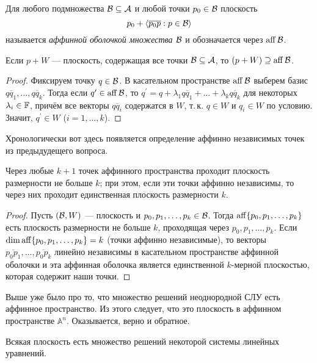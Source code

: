 \begin{definition}
    Для любого подмножества $\mathcal{B} \subseteq \mathcal{A}$ и любой точки $p_0 \in \mathcal{B}$ плоскость
    \[
        p_0 + \langle\overline{p_0p} : p \in \mathcal{B}\rangle
    \]
    называется \textit{аффинной оболочкой множества $\mathcal{B}$} и обозначается через $\operatorname{aff}\mathcal{B}$.
\end{definition}

\begin{proposal}
    Если $p + W$ --- плоскость, содержащая все точки $\mathcal{B} \subseteq \mathcal{A}$, то $(p + W) \supseteq \operatorname{aff}\mathcal{B}$.
\end{proposal}

\begin{proof}
    Фиксируем точку $q \in \mathcal{B}$. В касательном пространстве $\operatorname{aff}\mathcal{B}$ выберем базис $\overline{qq_1}, \ldots, \overline{qq_k}$. Тогда если $q^\prime \in \operatorname{aff}\mathcal{B}$, то $q^\prime = q + \lambda_1\overline{qq_1} + \ldots + \lambda_k\overline{qq_k}$ для некоторых $\lambda_i \in \mathbb{F}$, причём все векторы $\overline{qq_i}$ содержатся в $W$, т.\,к. $q \in W$ и $q_i \in W$ по условию. Значит, $q^\prime \in W$ ($i = 1, \ldots, k$).
\end{proof}

Хронологически вот здесь появляется определение аффинно независимых точек из предыдудещего вопроса.

\begin{theorem}
    Через любые $k + 1$ точек аффинного пространства проходит плоскость размерности не больше $k$; при этом, если эти точки аффинно независимы, то через них проходит единственная плоскость размерности $k$.
\end{theorem}

\begin{proof}
    Пусть $(\mathcal{B}, W)$ --- плоскость и $p_0, p_1, \ldots, p_k \in \mathcal{B}$. Тогда $\operatorname{aff}\{p_0, p_1, \ldots, p_k\}$ есть плоскость размерности не больше $k$, проходящая через $p_0, p_1, \ldots, p_k$. Если $\dim\operatorname{aff}\{p_0, p_1, \ldots, p_k\} = k$ (точки аффинно независимые), то векторы $\overline{p_0p_1}, \ldots, \overline{p_0p_k}$ линейно независимы в касательном пространстве аффинной оболочки и эта аффинная оболочка является единственной $k$-мерной плоскостью, которая содержит наши точки.
\end{proof}

Выше уже было про то, что множество решений неоднородной СЛУ есть аффинное пространство. Из этого следует, что это плоскость в аффинном пространстве $\mathbb{A}^n$. Оказывается, верно и обратное.

\begin{theorem}
    Всякая плоскость есть множество решений некоторой системы линейных уравнений.
\end{theorem}

